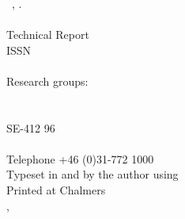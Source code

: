 


\quad \vfill

\noindent
\textbf{\lictitle}\\
\textsc{\licauthor}\\
\\
\textcopyright\ \licauthor, \licyear.\\
\\
Technical Report \TODO{\lictechreportno}\\
ISSN \licissn\\
\\
Research groups: \licresearchgroup\\
\licdepartment\\
\textsc{\licuniversity}\\
SE-412 96 \liccity \\
\liccountry\\
Telephone +46 (0)31-772 1000\\

\noindent
Typeset in \mainfontfamily{} and \monofontfamily{} by the author using \XeTeX\\
Printed at Chalmers \\ %
\liccity, \liccountry ~\licyear
